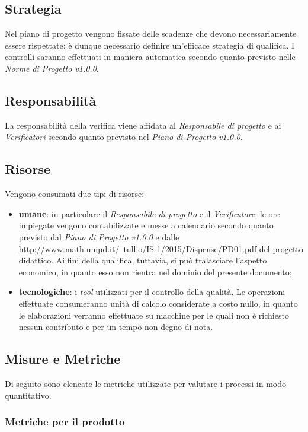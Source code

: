 \subsection{Strategia}
Nel piano di progetto vengono fissate delle scadenze che devono necessariamente essere rispettate: \`e dunque necessario definire un'efficace strategia di qualifica. I controlli saranno effettuati in maniera automatica secondo quanto previsto nelle \textit{Norme di Progetto v1.0.0}. 

\subsection{Responsabilit\`a}
La responsabilit\`a della verifica viene affidata al \textit{Responsabile di progetto} e ai \textit{Verificatori} secondo quanto previsto nel \textit{Piano di Progetto v1.0.0}.

\subsection{Risorse}
Vengono consumati due tipi di risorse:
\begin{itemize}
	\item \textbf{umane}: in particolare il \textit{Responsabile di progetto} e il \textit{Verificatore}; le ore impiegate vengono contabilizzate e messe a calendario secondo quanto previsto dal \textit{Piano di Progetto v1.0.0} e dalle \href{regole}{http://www.math.unipd.it/~tullio/IS-1/2015/Dispense/PD01.pdf} del progetto didattico. Ai fini della qualifica, tuttavia, si pu\`o tralasciare l'aspetto economico, in quanto esso non rientra nel dominio del presente documento;
		\item \textbf{tecnologiche}: i \textit{tool} utilizzati per il controllo della qualit\`a. Le operazioni effettuate  consumeranno unit\`a di calcolo considerate a costo nullo, in quanto le elaborazioni verranno effettuate su macchine per le quali non \`e richiesto nessun contributo e per un tempo non degno di nota.
\end{itemize}

\subsection{Misure e Metriche}
Di seguito sono elencate le metriche utilizzate per valutare i processi in modo quantitativo.

\subsubsection{Metriche per il prodotto}

